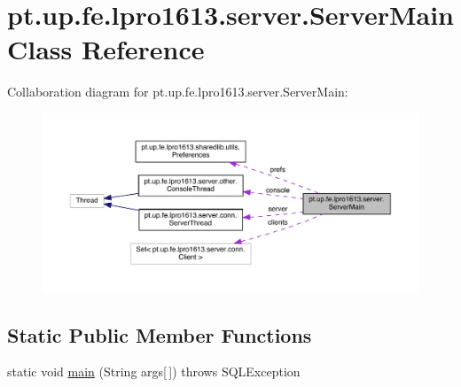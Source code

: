 \hypertarget{classpt_1_1up_1_1fe_1_1lpro1613_1_1server_1_1_server_main}{}\section{pt.\+up.\+fe.\+lpro1613.\+server.\+Server\+Main Class Reference}
\label{classpt_1_1up_1_1fe_1_1lpro1613_1_1server_1_1_server_main}


Collaboration diagram for pt.\+up.\+fe.\+lpro1613.\+server.\+Server\+Main\+:
\nopagebreak
\begin{figure}[H]
\begin{center}
\leavevmode
\includegraphics[width=350pt]{classpt_1_1up_1_1fe_1_1lpro1613_1_1server_1_1_server_main__coll__graph}
\end{center}
\end{figure}
\subsection*{Static Public Member Functions}
\begin{DoxyCompactItemize}
\item 
static void \hyperlink{classpt_1_1up_1_1fe_1_1lpro1613_1_1server_1_1_server_main_aa3501ccad0bb4a2f62168d8f84b12021}{main} (String args\mbox{[}$\,$\mbox{]})  throws S\+Q\+L\+Exception 
\end{DoxyCompactItemize}
